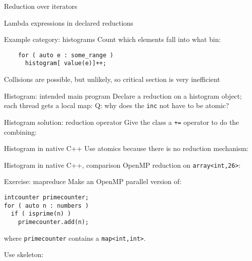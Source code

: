 \begin{numberedframe}{Reduction over iterators}
  
\end{numberedframe}

\begin{numberedframe}{Lambda expressions in declared reductions}
  
\end{numberedframe}


\begin{numberedframe}{Example category: histograms}
  Count which elements fall into what bin:
  \begin{lstlisting}
    for ( auto e : some_range )
      histogram[ value(e)]++;
  \end{lstlisting}
  Collisions are possible, but unlikely, so critical section is very inefficient
\end{numberedframe}

\begin{numberedframe}{Histogram: intended main program}
  Declare a reduction on a histogram object;\\
  each thread gets a local map:
  Q: why does the \lstinline{inc} not have to be atomic?
\end{numberedframe}

\begin{numberedframe}{Histogram solution: reduction operator}
  Give the class a \lstinline{+=} operator to do the combining:
  \footnotesize
\end{numberedframe}

\begin{numberedframe}{Histogram in native C++}
  Use atomics because there is no reduction mechanism:
\end{numberedframe}

\begin{numberedframe}{Histogram in native C++, comparison}
  OpenMP reduction on \lstinline{array<int,26>}:
  \footnotesize
  
\end{numberedframe}

\begin{numberedframe}{Exercise: mapreduce}
  Make an OpenMP parallel version of:
\begin{lstlisting}
intcounter primecounter;
for ( auto n : numbers )
  if ( isprime(n) )
    primecounter.add(n);
\end{lstlisting}
  where \lstinline{primecounter} contains a \lstinline|map<int,int>|.

  Use skeleton:   
\end{numberedframe}

